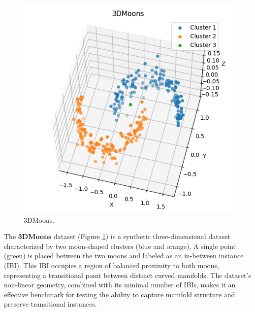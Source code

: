 \begin{figure}
    \centering
    \includegraphics[width=\myimgwidth]{images/datasets/3DMoons.png}
    \caption{3DMoons.}
    \label{fig:3DMoons}
\end{figure}
The \textbf{3DMoons} dataset (Figure \ref{fig:3DMoons}) is a synthetic three-dimensional dataset characterized by two moon-shaped clusters (blue and orange). A single point (green) is placed between the two moons and labeled as an in-between instance (IBI). This IBI occupies a region of balanced proximity to both moons, representing a transitional point between distinct curved manifolds. The dataset’s non-linear geometry, combined with its minimal number of IBIs, makes it an effective benchmark for testing the ability to capture manifold structure and preserve transitional instances.
\newline

